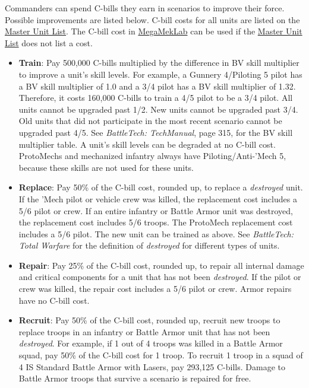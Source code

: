 Commanders can spend C-bills they earn in scenarios to improve their force.
Possible improvements are listed below.
C-bill costs for all units are listed on the \href{http://www.masterunitlist.info}{Master Unit List}.
The C-bill cost in \href{https://megamek.org}{MegaMekLab} can be used if the \href{http://www.masterunitlist.info}{Master Unit List} does not list a cost.

\begin{itemize}

\item {\bfseries Train}: Pay 500,000 C-bills multiplied by the difference in BV skill multiplier to improve a unit's skill levels.
For example, a Gunnery 4/Piloting 5 pilot has a BV skill multiplier of 1.0 and a 3/4 pilot has a BV skill multiplier of 1.32.
Therefore, it costs 160,000 C-bills to train a 4/5 pilot to be a 3/4 pilot.
All units cannot be upgraded past 1/2.
New units cannot be upgraded past 3/4.
Old units that did not participate in the most recent scenario cannot be upgraded past 4/5.
See \emph{BattleTech: TechManual}, page 315, for the BV skill multiplier table.
A unit's skill levels can be degraded at no C-bill cost.
ProtoMechs and mechanized infantry always have Piloting/Anti-'Mech 5, because these skills are not used for these units.

\item {\bfseries Replace}: Pay 50\% of the C-bill cost, rounded up, to replace a \emph{destroyed} unit.
If the 'Mech pilot or vehicle crew was killed, the replacement cost includes a 5/6 pilot or crew.
If an entire infantry or Battle Armor unit was destroyed, the replacement cost includes 5/6 troops.
The ProtoMech replacement cost includes a 5/6 pilot.
The new unit can be trained as above.
See \emph{BattleTech: Total Warfare} for the definition of \emph{destroyed} for different types of units.

\item {\bfseries Repair}: Pay 25\% of the C-bill cost, rounded up, to repair all internal damage and critical components for a unit that has not been \emph{destroyed}.
If the pilot or crew was killed, the repair cost includes a 5/6 pilot or crew.
Armor repairs have no C-bill cost.

\item {\bfseries Recruit}: Pay 50\% of the C-bill cost, rounded up, recruit new troops to replace troops in an infantry or Battle Armor unit that has not been \emph{destroyed}.
For example, if 1 out of 4 troops was killed in a Battle Armor squad, pay 50\% of the C-bill cost for 1 troop.
To recruit 1 troop in a squad of 4 IS Standard Battle Armor with Lasers, pay 293,125 C-bills.
Damage to Battle Armor troops that survive a scenario is repaired for free.


\end{itemize}
